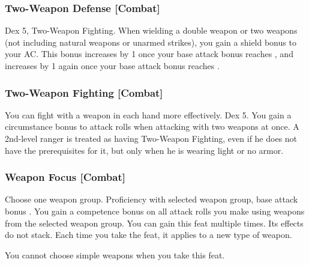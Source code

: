 \subsubsection{Two-Weapon Defense [Combat]}
 Dex 5, Two-Weapon Fighting.
 When wielding a double weapon or two weapons (not including natural weapons or unarmed strikes), you gain a  shield bonus to your AC. This bonus increases by 1 once your base attack bonus reaches , and increases by 1 again once your base attack bonus reaches .

\subsubsection{Two-Weapon Fighting [Combat]}
You can fight with a weapon in each hand more effectively.
 Dex 5.
 You gain a  circumstance bonus to attack rolls when attacking with two weapons at once.
 A 2nd-level ranger is treated as having Two-Weapon Fighting, even if he does not have the prerequisites for it, but only when he is wearing light or no armor.


\subsubsection{Weapon Focus [Combat]}
Choose one weapon group.
 Proficiency with selected weapon group, base attack bonus .
 You gain a  competence bonus on all attack rolls you make using weapons from the selected weapon group.
 You can gain this feat multiple times. Its effects do not stack. Each time you take the feat, it applies to a new type of weapon.
\par You cannot choose simple weapons when you take this feat.


